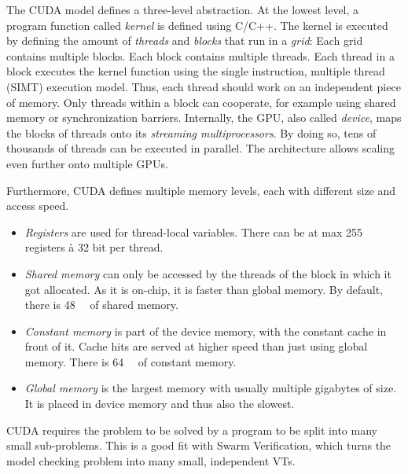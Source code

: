 \documentclass[
fancyheadings, %
%
%
]{stsreprt}
\begin{document}
The CUDA model defines a three-level abstraction.
At the lowest level, a program function called \emph{kernel} is defined using C/C++.
The kernel is executed by defining the amount of \emph{threads} and \emph{blocks} that run in a \emph{grid}:
Each grid contains multiple blocks.
Each block contains multiple threads.
Each thread in a block executes the kernel function using the single instruction, multiple thread (SIMT) execution model.
Thus, each thread should work on an independent piece of memory.
Only threads within a block can cooperate, for example using shared memory or synchronization barriers.
Internally, the GPU, also called \emph{device}, maps the blocks of threads onto its \emph{streaming multiprocessors}.
By doing so, tens of thousands of threads can be executed in parallel.
The architecture allows scaling even further onto multiple GPUs.

Furthermore, CUDA defines multiple memory levels, each with different size and access speed.

\begin{itemize}
    \item \emph{Registers} are used for thread-local variables.
          There can be at max 255 registers à 32 bit per thread.


    \item \emph{Shared memory} can only be accessed by the threads of the block in which it got allocated.
          As it is on-chip, it is faster than global memory.
          By default, there is \SI{48}{\kibi\byte} of shared memory.

    \item \emph{Constant memory} is part of the device memory, with the constant cache in front of it.
          Cache hits are served at higher speed than just using global memory.
          There is \SI{64}{\kibi\byte} of constant memory.


    \item \emph{Global memory} is the largest memory with usually multiple gigabytes of size.
          It is placed in device memory and thus also the slowest.
\end{itemize}

CUDA requires the problem to be solved by a program to be split into many small sub-problems.
This is a good fit with Swarm Verification, which turns the model checking problem into many small, independent VTs.
\end{document}
